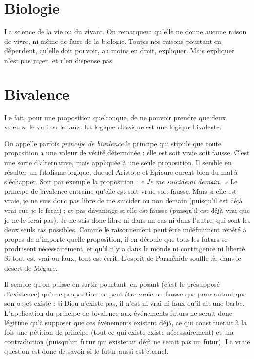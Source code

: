 \section{Biologie}
La science de la vie ou du vivant. On remarquera qu’elle ne
donne aucune raison de vivre, ni même de faire de la biologie.
Toutes nos raisons pourtant en dépendent, qu’elle doit pouvoir, au moins en
droit, expliquer. Mais expliquer n’est pas juger, et n’en dispense pas.

\section{Bivalence}
Le fait, pour une proposition quelconque, de ne pouvoir
prendre que deux valeurs, le vrai ou le faux. La logique classique
est une logique bivalente.

On appelle parfois {\it principe de bivalence} le principe qui stipule que toute
proposition a une valeur de vérité déterminée : elle est soit vraie soit fausse.
C’est une sorte d’alternative, mais appliquée à une seule proposition. Il semble
en résulter un fatalisme logique, duquel Aristote et Épicure eurent bien du mal
à s'échapper. Soit par exemple la proposition : {\it « Je me suiciderai demain. »} Le
principe de bivalence entraîne qu’elle est soit vraie soit fausse. Mais si elle est
vraie, je ne suis donc pas libre de me suicider ou non demain (puisqu'il est déjà
vrai que je le ferai) ; et pas davantage si elle est fausse (puisqu'il est déjà vrai que
je ne le ferai pas). Je ne suis donc libre ni dans un cas ni dans l’autre, qui sont
les deux seuls cas possibles. Comme le raisonnement peut être indéfiniment
répété à propos de n’importe quelle proposition, il en découle que tous les
futurs se produisent nécessairement, et qu’il n’y a dans le monde ni contingence
ni liberté. Si tout est vrai ou faux, tout est écrit. L'esprit de Parménide
souffle là, dans le désert de Mégare.

Il semble qu’on puisse en sortir pourtant, en posant (c’est le présupposé
d’existence) qu’une proposition ne peut être vraie ou fausse que pour autant
que son objet existe : si Dieu n'existe pas, il n’est ni vrai ni faux qu'il ait une
barbe. L'application du principe de bivalence aux événements futurs ne serait
donc légitime qu’à supposer que ces événements existent déjà, ce qui constituerait
à la fois une pétition de principe (tout ce qui existe existe nécessairement)
et une contradiction (puisqu’un futur qui existerait déjà ne serait pas un futur).
La vraie question est donc de savoir si le futur aussi est éternel.

